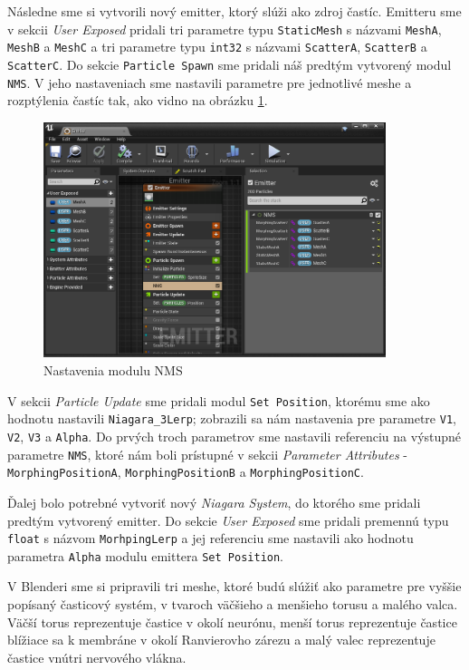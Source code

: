Následne sme si vytvorili nový emitter, ktorý slúži ako zdroj častíc. Emitteru sme v sekcii \emph{User Exposed} pridali tri parametre typu \texttt{StaticMesh} s názvami \texttt{MeshA}, \texttt{MeshB} a \texttt{MeshC}
a tri parametre typu \texttt{int32} s názvami \texttt{ScatterA}, \texttt{ScatterB} a \texttt{ScatterC}. Do sekcie \texttt{Particle Spawn} sme pridali náš predtým vytvorený modul \texttt{NMS}. V jeho nastaveniach sme 
nastavili parametre pre jednotlivé meshe a rozptýlenia častíc tak, ako vidno na obrázku \ref{nms-settings}. 

\begin{figure}[!htbp]
  \centering
  \includegraphics[width=10cm]{img/nms-settings.png}
  \caption{Nastavenia modulu NMS}
  \label{nms-settings}
\end{figure}	

V sekcii \emph{Particle Update} sme pridali modul \texttt{Set Position}, ktorému sme ako hodnotu nastavili 
\texttt{Niagara\_3Lerp}; zobrazili sa nám nastavenia pre parametre \texttt{V1}, \texttt{V2}, \texttt{V3} a \texttt{Alpha}. Do prvých troch parametrov sme nastavili referenciu na výstupné parametre \texttt{NMS}, ktoré
nám boli prístupné v sekcii \emph{Parameter Attributes} - \texttt{MorphingPositionA}, \texttt{MorphingPositionB} a \texttt{MorphingPositionC}. 

Ďalej bolo potrebné vytvoriť nový \emph{Niagara System}, do ktorého sme pridali predtým vytvorený emitter. Do sekcie \emph{User Exposed} sme pridali premennú typu \texttt{float} s názvom \texttt{MorhpingLerp} a jej 
referenciu sme nastavili ako hodnotu parametra \texttt{Alpha} modulu emittera \texttt{Set Position}.

V Blenderi sme si pripravili tri meshe, ktoré budú slúžiť ako parametre pre vyššie popísaný časticový systém, v tvaroch väčšieho a menšieho torusu a malého valca. Väčší torus reprezentuje častice v okolí neurónu, 
menší torus reprezentuje častice blížiace sa k membráne v okolí Ranvierovho zárezu a malý valec reprezentuje častice vnútri nervového vlákna.

